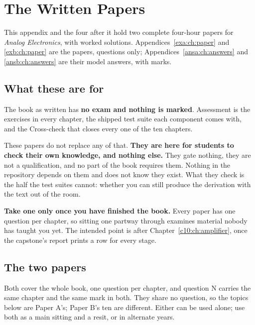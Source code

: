 
\chapter{The Written Papers}
\label{exam:ch:about}

This appendix and the four after it hold two complete four-hour papers for
\emph{Analog Electronics}, with worked solutions. Appendices~\ref{exa:ch:paper} and
\ref{exb:ch:paper} are the papers, questions only; Appendices~\ref{ansa:ch:answers}
and \ref{ansb:ch:answers} are their model answers, with marks.

\section*{What these are for}

The book as written has \textbf{no exam and nothing is marked}. Assessment is the exercises in every chapter, the shipped test suite each component comes with, and the Cross-check that closes every one of the ten chapters.

These papers do not replace any of that. \textbf{They are here for students to check their own knowledge, and nothing else.} They gate nothing, they are not a qualification, and no part of the book requires them. Nothing in the repository depends on them and  does not know they exist. What they check is the half the test suites cannot: whether you can still produce the derivation with the text out of the room.

\textbf{Take one only once you have finished the book.} Every paper has one question per chapter, so sitting one partway through examines material nobody has taught you yet. The intended point is after Chapter~\ref{c10:ch:amplifier}, once the capstone's report prints a row for every stage.

\section*{The two papers}

Both cover the whole book, one question per chapter, and question N carries the same chapter and the same mark in both. They share no question, so the topics below are Paper A's; Paper B's ten are different. Either can be used alone; use both as a main sitting and a resit, or in alternate years.

